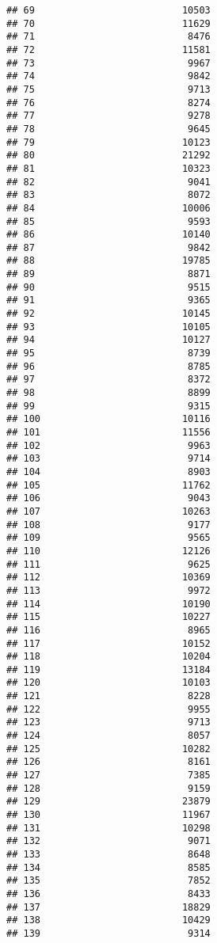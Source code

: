 \documentclass[
]{article}
\begin{document}
\begin{verbatim}
## 69                          10503
## 70                          11629
## 71                           8476
## 72                          11581
## 73                           9967
## 74                           9842
## 75                           9713
## 76                           8274
## 77                           9278
## 78                           9645
## 79                          10123
## 80                          21292
## 81                          10323
## 82                           9041
## 83                           8072
## 84                          10006
## 85                           9593
## 86                          10140
## 87                           9842
## 88                          19785
## 89                           8871
## 90                           9515
## 91                           9365
## 92                          10145
## 93                          10105
## 94                          10127
## 95                           8739
## 96                           8785
## 97                           8372
## 98                           8899
## 99                           9315
## 100                         10116
## 101                         11556
## 102                          9963
## 103                          9714
## 104                          8903
## 105                         11762
## 106                          9043
## 107                         10263
## 108                          9177
## 109                          9565
## 110                         12126
## 111                          9625
## 112                         10369
## 113                          9972
## 114                         10190
## 115                         10227
## 116                          8965
## 117                         10152
## 118                         10204
## 119                         13184
## 120                         10103
## 121                          8228
## 122                          9955
## 123                          9713
## 124                          8057
## 125                         10282
## 126                          8161
## 127                          7385
## 128                          9159
## 129                         23879
## 130                         11967
## 131                         10298
## 132                          9071
## 133                          8648
## 134                          8585
## 135                          7852
## 136                          8433
## 137                         18829
## 138                         10429
## 139                          9314

\end{verbatim}
\end{document}
